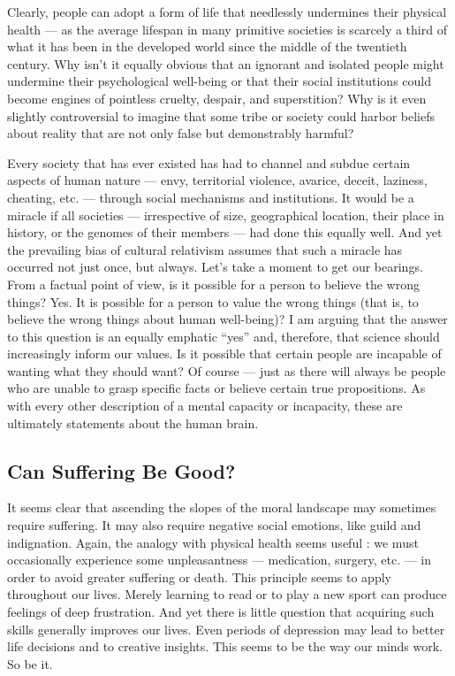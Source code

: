 \documentclass[a4paper,14pt]{extbook}
\begin{document}
Clearly, people can adopt a form of life that needlessly undermines their physical health --- as the average lifespan in many primitive societies is scarcely a third of what it has been in the developed world since the middle of the twentieth century.
Why isn't it equally obvious that an ignorant and isolated people might undermine their psychological well-being or that their social institutions could become engines of pointless cruelty, despair, and superstition?
Why is it even slightly controversial to imagine that some tribe or society could harbor beliefs about reality that are not only false but demonstrably harmful?

Every society that has ever existed has had to channel and subdue certain aspects of human nature --- envy, territorial violence, avarice, deceit, laziness, cheating, etc. --- through social mechanisms and institutions.
It would be a miracle if all societies --- irrespective of size, geographical location, their place in history, or the genomes of their members --- had done this equally well.
And yet the prevailing bias of cultural relativism assumes that such a miracle has occurred not just once, but always.
Let's take a moment to get our bearings.
From a factual point of view, is it possible for a person to believe the wrong things?
Yes.
It is possible for a person to value the wrong things (that is, to believe the wrong things about human well-being)?
I am arguing that the answer to this question is an equally emphatic ``yes'' and, therefore, that science should increasingly inform our values.
Is it possible that certain people are incapable of wanting what they should want?
Of course --- just as there will always be people who are unable to grasp specific facts or believe certain true propositions.
As with every other description of a mental capacity or incapacity, these are ultimately statements about the human brain.

\subsection{Can Suffering Be Good?}

It seems clear that ascending the slopes of the moral landscape may sometimes require suffering.
It may also require negative social emotions, like guild and indignation.
Again, the analogy with physical health seems useful :
we must occasionally experience some unpleasantness --- medication, surgery, etc. --- in order to avoid greater suffering or death.
This principle seems to apply throughout our lives.
Merely learning to read or to play a new sport can produce feelings of deep frustration.
And yet there is little question that acquiring such skills generally improves our lives.
Even periods of depression may lead to better life decisions and to creative insights.
This seems to be the way our minds work.
So be it.
\end{document}
